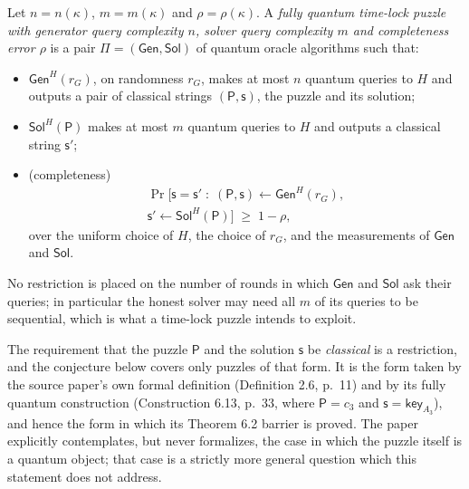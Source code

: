 \documentclass{conjura-conjecture}
\newcommand{\Gen}{\mathsf{Gen}}
\newcommand{\Sol}{\mathsf{Sol}}
\newcommand{\puz}{\mathsf{P}}
\newcommand{\solu}{\mathsf{s}}
\newcommand{\solhon}{\mathsf{s}'}
\begin{document}
\begin{definition}\label{def:qgqs-tlp}
Let $n = n(\kappa)$, $m = m(\kappa)$ and $\rho = \rho(\kappa)$. A
\emph{fully quantum time-lock puzzle with generator query complexity $n$,
solver query complexity $m$ and completeness error $\rho$} is a pair
$\Pi = (\Gen, \Sol)$ of quantum oracle algorithms such that:
\begin{itemize}
  \item $\Gen^{H}(r_G)$, on randomness $r_G$, makes at most $n$ quantum
    queries to $H$ and outputs a pair of classical strings
    $(\puz, \solu)$, the puzzle and its solution;
  \item $\Sol^{H}(\puz)$ makes at most $m$ quantum queries to $H$ and
    outputs a classical string $\solhon$;
  \item (completeness)
    \begin{multline*}
      \Pr\bigl[\solu = \solhon \;:\;
        (\puz, \solu) \leftarrow \Gen^{H}(r_G), \\
        \solhon \leftarrow \Sol^{H}(\puz)\bigr] \;\ge\; 1 - \rho,
    \end{multline*}
    over the uniform choice of $H$, the choice of $r_G$, and the
    measurements of $\Gen$ and $\Sol$.
\end{itemize}
No restriction is placed on the number of rounds in which $\Gen$ and $\Sol$
ask their queries; in particular the honest solver may need all $m$ of its
queries to be sequential, which is what a time-lock puzzle intends to
exploit.

The requirement that the puzzle $\puz$ and the solution $\solu$ be
\emph{classical} is a restriction, and the conjecture below covers only
puzzles of that form. It is the form taken by the source paper's own formal
definition (Definition 2.6, p.~11) and by its fully quantum construction
(Construction 6.13, p.~33, where $\puz = c_3$ and
$\solu = \mathsf{key}_{A_3}$), and hence the form in which its Theorem 6.2
barrier is proved. The paper explicitly contemplates, but never formalizes,
the case in which the puzzle itself is a quantum object; that case is a
strictly more general question which this statement does not address.
\end{definition}
\end{document}
